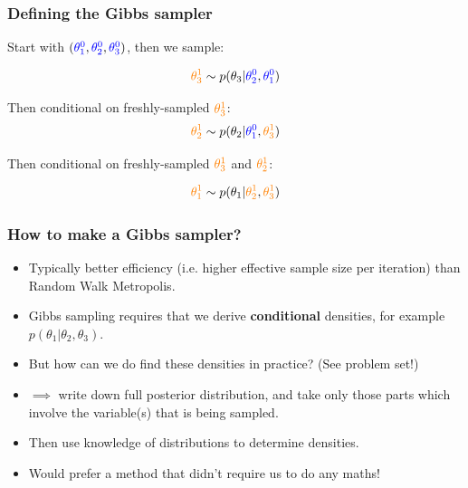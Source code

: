 \documentclass[handout]{beamer}
\begin{document}
\begin{frame}
	\frametitle{Defining the Gibbs sampler}
	
	Start with $(\textcolor{blue}{\theta^0_1},\textcolor{blue}{\theta^0_2},\textcolor{blue}{\theta^0_3})$, then we sample:
	
	\begin{equation}
	\textcolor{orange}{\theta^1_3}\sim p(\theta_3|\textcolor{blue}{\theta^0_2},\textcolor{blue}{\theta^0_1})
	\end{equation}
	
	 Then conditional on freshly-sampled $\textcolor{orange}{\theta^1_3}$:
	\onslide<4->
	\begin{equation}
	\textcolor{orange}{\theta^1_2}\sim p(\theta_2|\textcolor{blue}{\theta^0_1},\textcolor{orange}{\theta^1_3})
	\end{equation}
	
	 Then conditional on freshly-sampled $\textcolor{orange}{\theta^1_3}$ and $\textcolor{orange}{\theta^1_2}$:
	\onslide<6->
	
	\begin{equation}
	\textcolor{orange}{\theta^1_1}\sim p(\theta_1|\textcolor{orange}{\theta^1_2},\textcolor{orange}{\theta^1_3})
	\end{equation}
	
\end{frame}

\begin{frame}
	\frametitle{How to make a Gibbs sampler?}
	
	\begin{itemize}
		\item<2-> Typically better efficiency (i.e. higher effective sample size per iteration) than Random Walk Metropolis.
		\item<3-> Gibbs sampling requires that we derive \textbf{conditional} densities, for example $p(\theta_1|\theta_2,\theta_3)$.
		\item<4-> But how can we do find these densities in practice? (See problem set!)
		\item<5-> $\implies$ write down full posterior distribution, and take only those parts which involve the variable(s) that is being sampled.
		\item<6-> Then use knowledge of distributions to determine densities.
		\item<7-> Would prefer a method that didn't require us to do any maths!
	\end{itemize}
	
\end{frame}
\end{document}
